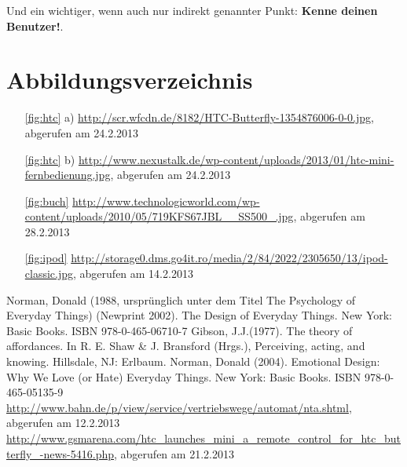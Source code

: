 \documentclass[parskip,headsepline, headtopline, %
footsepline, oneside, 12pt, headings=small]{scrreprt}
\begin{document}
Und ein wichtiger, wenn auch nur indirekt genannter Punkt: \textbf{Kenne deinen Benutzer!}. 

\chapter*{Abbildungsverzeichnis}


\begin{itemize}
\item[\ref{fig:htc} a)] \url{http://scr.wfcdn.de/8182/HTC-Butterfly-1354876006-0-0.jpg}, abgerufen am 24.2.2013
\item[\ref{fig:htc} b)] \url{http://www.nexustalk.de/wp-content/uploads/2013/01/htc-mini-fernbedienung.jpg}, abgerufen am 24.2.2013
\item[\ref{fig:buch}] \url{http://www.technologicworld.com/wp-content/uploads/2010/05/719KFS67JBL__SS500_.jpg}, abgerufen am 28.2.2013
\item[\ref{fig:ipod}] \url{http://storage0.dms.go4it.ro/media/2/84/2022/2305650/13/ipod-classic.jpg}, abgerufen am 14.2.2013
\end{itemize}

\begin{thebibliography}{9}
	 Norman, Donald  (1988, ursprünglich unter dem Titel The Psychology of Everyday Things) (Newprint 2002). The Design of Everyday Things. New York: Basic Books. ISBN 978-0-465-06710-7 
	 Gibson, J.J.(1977). The theory of affordances. In R. E. Shaw \& J. Bransford (Hrgs.), Perceiving, acting, and knowing. Hillsdale, NJ: Erlbaum.
	 Norman, Donald (2004). Emotional Design: Why We Love (or Hate) Everyday Things. New York: Basic Books. ISBN 978-0-465-05135-9
	 \url{http://www.bahn.de/p/view/service/vertriebswege/automat/nta.shtml}, abgerufen am 12.2.2013
	  \url{http://www.gsmarena.com/htc_launches_mini_a_remote_control_for_htc_butterfly_-news-5416.php}, abgerufen am 21.2.2013
\end{thebibliography}
\end{document}
